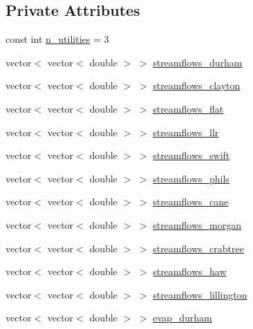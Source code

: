 \subsection*{Private Attributes}
\begin{DoxyCompactItemize}
\item 
const int \mbox{\hyperlink{classPaperTestProblem_af4990348248cc169eb2137003dbe2e00}{n\+\_\+utilities}} = 3
\item 
vector$<$ vector$<$ double $>$ $>$ \mbox{\hyperlink{classPaperTestProblem_a6169e129c59da20034c2f9be422d517f}{streamflows\+\_\+durham}}
\item 
vector$<$ vector$<$ double $>$ $>$ \mbox{\hyperlink{classPaperTestProblem_a4e7333f37fe66ba2cc893da6a63923a2}{streamflows\+\_\+clayton}}
\item 
vector$<$ vector$<$ double $>$ $>$ \mbox{\hyperlink{classPaperTestProblem_a64ec117093c48136883b8ece3842ebc4}{streamflows\+\_\+flat}}
\item 
vector$<$ vector$<$ double $>$ $>$ \mbox{\hyperlink{classPaperTestProblem_ad9662a0ff669acb6b4fe37672dce1932}{streamflows\+\_\+llr}}
\item 
vector$<$ vector$<$ double $>$ $>$ \mbox{\hyperlink{classPaperTestProblem_a6d22fc82ecff030315ffd8c4b464f239}{streamflows\+\_\+swift}}
\item 
vector$<$ vector$<$ double $>$ $>$ \mbox{\hyperlink{classPaperTestProblem_aadc7191d1960cd52ee527196aabee985}{streamflows\+\_\+phils}}
\item 
vector$<$ vector$<$ double $>$ $>$ \mbox{\hyperlink{classPaperTestProblem_aacac987101625859b4d6192bffcb08a2}{streamflows\+\_\+cane}}
\item 
vector$<$ vector$<$ double $>$ $>$ \mbox{\hyperlink{classPaperTestProblem_a838a01bac4428be605162a7deab1cfff}{streamflows\+\_\+morgan}}
\item 
vector$<$ vector$<$ double $>$ $>$ \mbox{\hyperlink{classPaperTestProblem_ab329f309fe8b95a1cfddcbcb6f41cd75}{streamflows\+\_\+crabtree}}
\item 
vector$<$ vector$<$ double $>$ $>$ \mbox{\hyperlink{classPaperTestProblem_a7d96d2ddb089e51068380c1aa0e691e8}{streamflows\+\_\+haw}}
\item 
vector$<$ vector$<$ double $>$ $>$ \mbox{\hyperlink{classPaperTestProblem_a77aa63c91de59ca1445239a9ce7424df}{streamflows\+\_\+lillington}}
\item 
vector$<$ vector$<$ double $>$ $>$ \mbox{\hyperlink{classPaperTestProblem_aafd6edcc514c3b365c18fb3357f7d58a}{evap\+\_\+durham}}
\item 

\end{DoxyCompactItemize}
